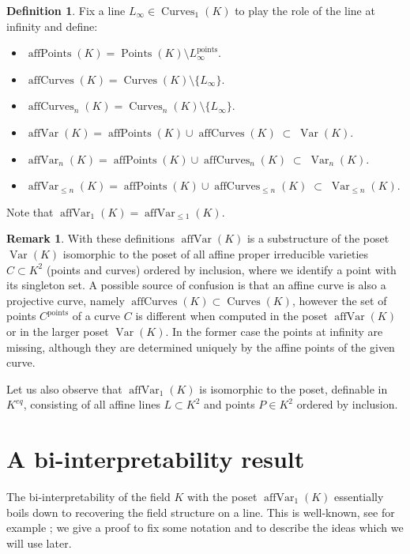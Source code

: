 \documentclass{amsart}
\theoremstyle{plain}
\theoremstyle{definition}
\newtheorem{rem}[thm]{Remark}
\newtheorem{defn}[thm]{Definition}
\newcommand{\Var}[1]{\operatorname{Var}(#1)}
\newcommand{\nVar}[2]{\operatorname{Var}_{#2} (#1)}
\newcommand{\Points}[1]{\operatorname{Points} (#1)}
\newcommand{\pt}[1]{{#1}^{\text{points}}}
\newcommand{\Curves}[1]{\operatorname{Curves}(#1)}
\newcommand{\nCurves}[2]{\operatorname{Curves}_{#2}(#1)}
\newcommand{\affPoints}[1]{\operatorname{affPoints} (#1)}
\newcommand{\affCurves}[1]{\operatorname{affCurves}(#1)}
\newcommand{\naffCurves}[2]{\operatorname{affCurves}_{#2}(#1)}
\newcommand{\affVar}[1]{\operatorname{affVar}(#1)}
\newcommand{\naffVar}[2]{\operatorname{affVar}_{#2}(#1)}
\begin{document}
\begin{defn}\label{defn:affine}  Fix a line $L_\infty\in \nCurves K 1$ to play the role of the line at infinity and define: 
\begin{itemize}
\item $\affPoints K = \Points K \setminus L_\infty^{\text{points}}$.
\item $\affCurves K = \Curves K \setminus \{L_\infty\}$.
\item $\naffCurves K n = \nCurves K n \setminus \{L_\infty\}$.
\item $\affVar K = \affPoints K \cup \affCurves K \; \subset\; \Var K$. 
\item $\naffVar K n = \affPoints K \cup \naffCurves K n \; \subset\; \nVar K n$. 
\item $\naffVar K {\leq n} = \affPoints K \cup \naffCurves K {\leq n} \; \subset\; \nVar K {\leq n}$. 
\end{itemize}
Note that $\naffVar K 1 = \naffVar K {\leq 1}$. 
\end{defn}

\begin{rem} \mbox{} \label{rem:affine}
With these definitions $\affVar K$ is a substructure of the poset $\Var K$ isomorphic to the poset of all affine proper irreducible varieties $C\subset K^2$ (points and curves) ordered by inclusion, where we identify a point with its singleton set.
A possible source of confusion is that an affine curve is also a projective curve, 
namely $\affCurves K \subset \Curves K$, however the set of points $\pt C$ of a curve $C$ is  different when computed in the poset $\affVar K$ or in the larger poset $\Var K$. In the former case the points at infinity are missing, although they are determined uniquely by the affine points of the given curve. 

Let us also observe that $\naffVar K {1}$ is isomorphic to 
		the poset, definable in $K^{eq}$, consisting of all affine lines $L\subset K^2$ and points $P\in K^2$ ordered by inclusion. 
\end{rem}

\section{A bi-interpretability result}\label{sec:biinter}

The bi-interpretability of the field $K$ with the poset $\naffVar K 1$ essentially boils down to recovering the field structure on a line. This is well-known, see for example \cite[Theorem 7.12]{Har}; we give a proof to fix some notation and to describe the ideas which we will use later.
 
\end{document}
